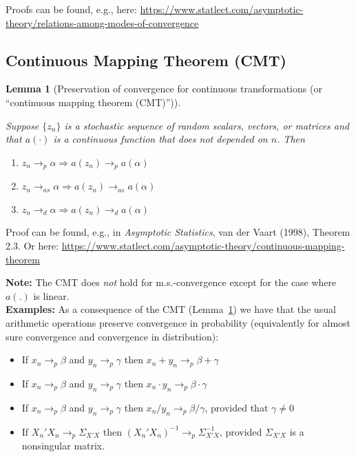 \documentclass[
  letterpaper,
  DIV=11,
  numbers=noendperiod]{scrreprt}
\providecommand{\tightlist}{%
  \setlength{\itemsep}{0pt}\setlength{\parskip}{0pt}}\usepackage{longtable,booktabs,array}
\theoremstyle{definition}
\theoremstyle{plain}
\theoremstyle{plain}
\newtheorem{lemma}{Lemma}[chapter]
\theoremstyle{remark}
\begin{document}
Proofs can be found, e.g., here:
\url{https://www.statlect.com/asymptotic-theory/relations-among-modes-of-convergence}

\hypertarget{continuous-mapping-theorem-cmt}{%
\subsection{Continuous Mapping Theorem
(CMT)}\label{continuous-mapping-theorem-cmt}}

\leavevmode{}%
\begin{lemma}[Preservation of convergence for continuous transformations
(or ``continuous mapping theorem (CMT)'')]\label{lem-Preserv}

Suppose \(\{z_n\}\) is a stochastic sequence of random scalars, vectors,
or matrices and that \(a(\cdot)\) is a continuous function that does not
depended on \(n\). Then

\begin{enumerate}
\def\labelenumi{(\roman{enumi})}
\tightlist
\item
  \(z_n\to_{p}\alpha\Rightarrow a(z_n)\to_{p} a(\alpha)\)
\item
  \(z_n\to_{as} \alpha\Rightarrow a(z_n)\to_{as} a(\alpha)\)
\item
  \(z_n\to_{d}\alpha\Rightarrow a(z_n)\to_{d} a(\alpha)\)
\end{enumerate}

\end{lemma}

Proof can be found, e.g., in \emph{Asymptotic Statistics}, van der Vaart
(1998), Theorem 2.3. Or here:
\url{https://www.statlect.com/asymptotic-theory/continuous-mapping-theorem}

\textbf{Note:} The CMT does \emph{not} hold for m.s.-convergence except
for the case where \(a(.)\) is linear.\\

\textbf{Examples:} As a consequence of the CMT (Lemma~\ref{lem-Preserv})
we have that the usual arithmetic operations preserve convergence in
probability (equivalently for almost sure convergence and convergence in
distribution):

\begin{itemize}
\tightlist
\item
  If \(x_n\to_{p} \beta\) and \(y_n\to_{p} \gamma\) then
  \(x_n+y_n\to_{p} \beta+\gamma\)
\item
  If \(x_n\to_{p} \beta\) and \(y_n\to_{p} \gamma\) then
  \(x_n\cdot y_n\to_{p} \beta\cdot\gamma\)
\item
  If \(x_n\to_{p} \beta\) and \(y_n\to_{p} \gamma\) then
  \(x_n/y_n\to_{p} \beta/\gamma\), provided that \(\gamma\neq 0\)
\item
  If \(X_n'X_n\to_{p} \Sigma_{X'X}\) then
  \((X_n'X_n)^{-1}\to_{p} \Sigma_{X'X}^{-1}\), provided \(\Sigma_{X'X}\)
  is a nonsingular matrix.
\end{itemize}
\end{document}
